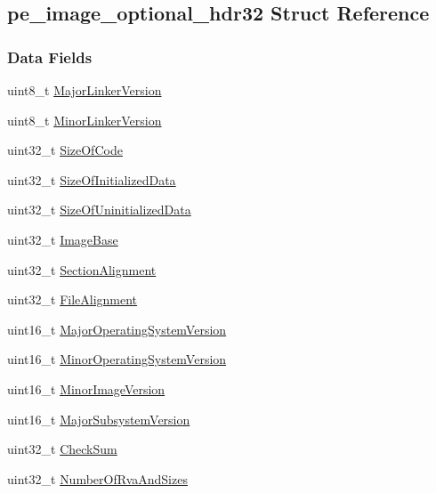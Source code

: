 \hypertarget{structpe__image__optional__hdr32}{
\subsection{pe\_\-image\_\-optional\_\-hdr32 Struct Reference}
\label{structpe__image__optional__hdr32}
}
\subsubsection*{Data Fields}
\begin{DoxyCompactItemize}
\item 
uint8\_\-t \hyperlink{structpe__image__optional__hdr32_a9fe20c528b23d8a85a250c33c761b840}{MajorLinkerVersion}
\item 
uint8\_\-t \hyperlink{structpe__image__optional__hdr32_a0cc5019694053488b343a458fbc0b657}{MinorLinkerVersion}
\item 
uint32\_\-t \hyperlink{structpe__image__optional__hdr32_abee9ed2d772fb9bec9f70e22d8f85c23}{SizeOfCode}
\item 
uint32\_\-t \hyperlink{structpe__image__optional__hdr32_a042c05a92b0c90acf2e1ee4672857153}{SizeOfInitializedData}
\item 
uint32\_\-t \hyperlink{structpe__image__optional__hdr32_aa82afa1757a8a7b76df97b35b4afea84}{SizeOfUninitializedData}
\item 
uint32\_\-t \hyperlink{structpe__image__optional__hdr32_a29eb1ba379985eaa71d0c25142f90b50}{ImageBase}
\item 
uint32\_\-t \hyperlink{structpe__image__optional__hdr32_ae19363fc9558f4fe8d710789d031f9ac}{SectionAlignment}
\item 
uint32\_\-t \hyperlink{structpe__image__optional__hdr32_a52c4f3c684bea4212e4fb8289794eb0d}{FileAlignment}
\item 
uint16\_\-t \hyperlink{structpe__image__optional__hdr32_a47b3939102eef106f0fc4d6a96c3ad14}{MajorOperatingSystemVersion}
\item 
uint16\_\-t \hyperlink{structpe__image__optional__hdr32_a8eb1d37329b3c54e63e8eb7832e30ba7}{MinorOperatingSystemVersion}
\item 
uint16\_\-t \hyperlink{structpe__image__optional__hdr32_a7b61bcb8b63930c239079916325ae734}{MinorImageVersion}
\item 
uint16\_\-t \hyperlink{structpe__image__optional__hdr32_a8172c2f0be86708e0253c98df79e9055}{MajorSubsystemVersion}
\item 
uint32\_\-t \hyperlink{structpe__image__optional__hdr32_ab09f6da5ce2f33ac63606127b1bb2760}{CheckSum}
\item 
uint32\_\-t \hyperlink{structpe__image__optional__hdr32_a51e6fb2cbc64a53b2bb577f2dd2f677f}{NumberOfRvaAndSizes}
\end{DoxyCompactItemize}


